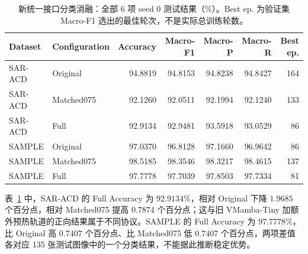 \documentclass[journal]{IEEEtran}
\begin{document}
\begin{table}[!t]
\centering
\small
\setlength{\tabcolsep}{3pt}
\caption{新统一接口分类消融：全部 6 项 seed 0 测试结果（\%）。Best ep. 为验证集 Macro-F1 选出的最佳轮次，不是实际总训练轮数。}
\label{tab:unified_class_seed0}
\begin{tabular*}{\textwidth}{@{\extracolsep{\fill}}llrrrrr}
\toprule
Dataset & Configuration & Accuracy & Macro-F1 & Macro-P & Macro-R & Best ep. \\
\midrule
SAR-ACD & Original & 94.8819 & 94.8153 & 94.8238 & 94.8427 & 164 \\
SAR-ACD & Matched075 & 92.1260 & 92.0511 & 92.1994 & 92.1240 & 133 \\
SAR-ACD & Full & 92.9134 & 92.9481 & 93.5918 & 93.0529 & 86 \\
\midrule
SAMPLE & Original & 97.0370 & 96.8128 & 97.1660 & 96.9642 & 86 \\
SAMPLE & Matched075 & 98.5185 & 98.3546 & 98.3217 & 98.4615 & 137 \\
SAMPLE & Full & 97.7778 & 97.7039 & 97.8503 & 97.7334 & 81 \\
\bottomrule
\end{tabular*}
\end{table}

表~\ref{tab:unified_class_seed0} 中，SAR-ACD 的 Full Accuracy 为 $92.9134\%$，相对 Original 下降 $1.9685$ 个百分点，相对 Matched075 提高 $0.7874$ 个百分点；这与旧 VMamba-Tiny 加额外预热轨道的正向结果属于不同协议。SAMPLE 的 Full Accuracy 为 $97.7778\%$，比 Original 高 $0.7407$ 个百分点、比 Matched075 低 $0.7407$ 个百分点，两项差值各对应 135 张测试图像中的一个分类结果，不能据此推断稳定优势。
\end{document}
